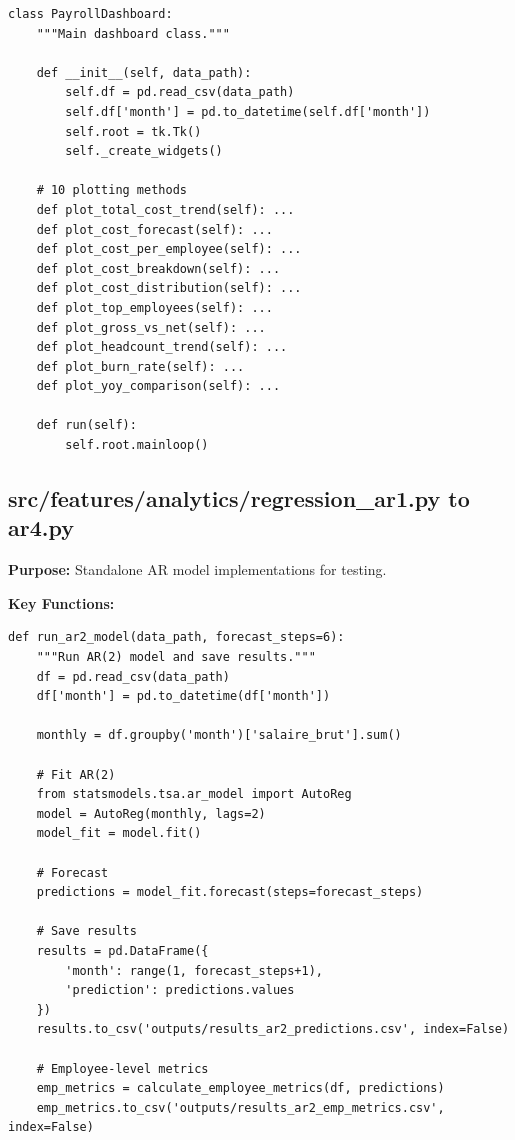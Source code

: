 \begin{lstlisting}[style=pythonstyle]
class PayrollDashboard:
    """Main dashboard class."""
    
    def __init__(self, data_path):
        self.df = pd.read_csv(data_path)
        self.df['month'] = pd.to_datetime(self.df['month'])
        self.root = tk.Tk()
        self._create_widgets()
    
    # 10 plotting methods
    def plot_total_cost_trend(self): ...
    def plot_cost_forecast(self): ...
    def plot_cost_per_employee(self): ...
    def plot_cost_breakdown(self): ...
    def plot_cost_distribution(self): ...
    def plot_top_employees(self): ...
    def plot_gross_vs_net(self): ...
    def plot_headcount_trend(self): ...
    def plot_burn_rate(self): ...
    def plot_yoy_comparison(self): ...
    
    def run(self):
        self.root.mainloop()
\end{lstlisting}

\subsection{src/features/analytics/regression\_ar1.py to ar4.py}

\textbf{Purpose:} Standalone AR model implementations for testing.

\textbf{Key Functions:}

\begin{lstlisting}[style=pythonstyle]
def run_ar2_model(data_path, forecast_steps=6):
    """Run AR(2) model and save results."""
    df = pd.read_csv(data_path)
    df['month'] = pd.to_datetime(df['month'])
    
    monthly = df.groupby('month')['salaire_brut'].sum()
    
    # Fit AR(2)
    from statsmodels.tsa.ar_model import AutoReg
    model = AutoReg(monthly, lags=2)
    model_fit = model.fit()
    
    # Forecast
    predictions = model_fit.forecast(steps=forecast_steps)
    
    # Save results
    results = pd.DataFrame({
        'month': range(1, forecast_steps+1),
        'prediction': predictions.values
    })
    results.to_csv('outputs/results_ar2_predictions.csv', index=False)
    
    # Employee-level metrics
    emp_metrics = calculate_employee_metrics(df, predictions)
    emp_metrics.to_csv('outputs/results_ar2_emp_metrics.csv', index=False)
\end{lstlisting}

